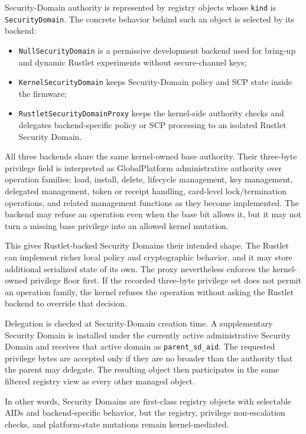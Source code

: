 Security-Domain authority is represented by registry objects whose
\texttt{kind} is \texttt{SecurityDomain}. The concrete behavior behind such an
object is selected by its backend:
\begin{itemize}
\item \texttt{NullSecurityDomain} is a permissive development backend used for
  bring-up and dynamic Rustlet experiments without secure-channel keys;
\item \texttt{KernelSecurityDomain} keeps Security-Domain policy and SCP state
  inside the firmware;
\item \texttt{RustletSecurityDomainProxy} keeps the kernel-side authority
  checks and delegates backend-specific policy or SCP processing to an isolated
  Rustlet Security Domain.
\end{itemize}

All three backends share the same kernel-owned base authority. Their
three-byte privilege field is interpreted as GlobalPlatform administrative
authority over operation families: load, install, delete, lifecycle
management, key management, delegated management, token or receipt handling,
card-level lock/termination operations, and related management functions as
they become implemented. The backend may refuse an operation even when the base
bit allows it, but it may not turn a missing base privilege into an allowed
kernel mutation.

This gives Rustlet-backed Security Domains their intended shape. The Rustlet
can implement richer local policy and cryptographic behavior, and it may store
additional serialized state of its own. The proxy nevertheless enforces the
kernel-owned privilege floor first. If the recorded three-byte privilege set
does not permit an operation family, the kernel refuses the operation without
asking the Rustlet backend to override that decision.

Delegation is checked at Security-Domain creation time. A supplementary
Security Domain is installed under the currently active administrative
Security Domain and receives that active domain as \texttt{parent\_sd\_aid}.
The requested privilege bytes are accepted only if they are no broader than the
authority that the parent may delegate. The resulting object then participates
in the same filtered registry view as every other managed object.

In other words, Security Domains are first-class registry objects with
selectable AIDs and backend-specific behavior, but the registry, privilege
non-escalation checks, and platform-state mutations remain kernel-mediated.

